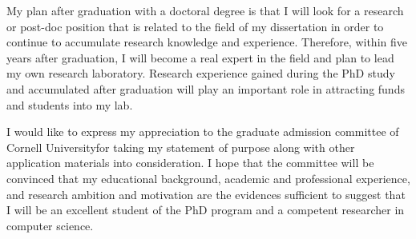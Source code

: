 \documentclass[a4paper,10pt]{report}
\newcommand{\university}{Cornell University}
\begin{document}
\vspace{0.2cm}
My plan after graduation with a doctoral degree is that I will look for a research or post-doc position that is related to the field of my dissertation in order to continue to accumulate research knowledge and experience. Therefore, within five years after graduation, I will become a real expert in the field and plan to lead my own research laboratory. Research experience gained during the PhD study and accumulated after graduation will play an important role in attracting funds and students into my lab.

\vspace{0.2cm}
I would like to express my appreciation to the graduate admission committee of \university \space for taking my statement of purpose along with other application materials into consideration. I hope that the committee will be convinced that my educational background, academic and professional experience, and research ambition and motivation are the evidences sufficient to suggest that I will be an excellent student of the PhD program and a competent researcher in computer science.
\end{document}
